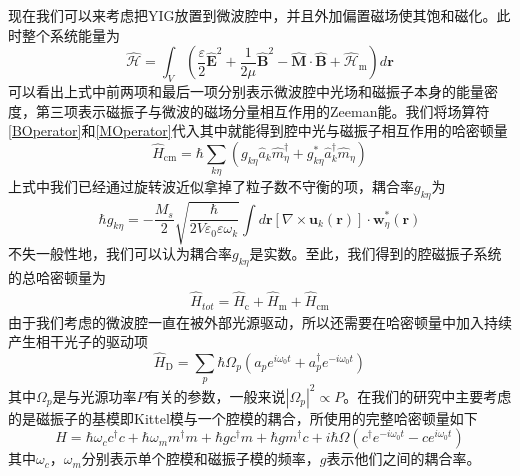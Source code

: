 现在我们可以来考虑把YIG放置到微波腔中，并且外加偏置磁场使其饱和磁化。此时整个系统能量为
\begin{equation}
\hat{\mathcal{H}}=\int_V \left(\frac{\varepsilon}{2} \hat{\mathbf{E}}^{2}+\frac{1}{2 \mu} \hat{\mathbf{B}}^{2}-\hat{\mathbf{M}} \cdot \hat{\mathbf{B}}+\hat{\mathcal{H}}_{\mathrm{m}}\right) d \mathbf{r}
\end{equation}
可以看出上式中前两项和最后一项分别表示微波腔中光场和磁振子本身的能量密度，第三项表示磁振子与微波的磁场分量相互作用的Zeeman能。我们将场算符\eqref{BOperator}和\eqref{MOperator}代入其中就能得到腔中光与磁振子相互作用的哈密顿量
\begin{equation}
\hat{H}_{\mathrm{cm}}=\hbar \sum_{k \eta}\left(g_{k \eta} \hat{a}_{k} \hat{m}_{\eta}^{\dagger}+g_{k \eta}^{*} \hat{a}_{k}^{\dagger} \hat{m}_{\eta}\right)
\end{equation}
上式中我们已经通过旋转波近似拿掉了粒子数不守衡的项，耦合率$g_{k \eta}$为
\begin{equation}
\hbar g_{k \eta}=-\frac{M_{s}}{2} \sqrt{\frac{\hbar}{2 V \varepsilon_{0} \varepsilon \omega_{k}}} \int d \mathbf{r}\left[\nabla \times \mathbf{u}_{k}(\mathbf{r})\right] \cdot \mathbf{w}_{\eta}^{*}(\mathbf{r})
\end{equation}
不失一般性地，我们可以认为耦合率$g_{k \eta}$是实数。至此，我们得到的腔磁振子系统的总哈密顿量为
\begin{equation}
\begin{aligned}
\hat{H}_{tot}=\hat{H}_{\mathrm{c}}+\hat{H}_{\mathrm{m}}+\hat{H}_{\mathrm{cm}}
\end{aligned}
\end{equation}
由于我们考虑的微波腔一直在被外部光源驱动，所以还需要在哈密顿量中加入持续产生相干光子的驱动项
\begin{equation}
\hat{H}_{\mathrm{D}}=\sum_{p} \hbar \Omega_{p}\left({a}_{p} e^{i \omega_{\mathrm{0}} t}+{a}_{p}^{\dagger} e^{-i \omega_{\mathrm{0}} t}\right)
\end{equation}
其中$\Omega_{p}$是与光源功率$P$有关的参数，一般来说$|\Omega_{p}|^2 \propto P$。在我们的研究中主要考虑的是磁振子的基模即Kittel模与一个腔模的耦合，所使用的完整哈密顿量如下
\begin{equation}
H = \hbar\omega_{c}c^{\dag}c+\hbar\omega_{m}m^{\dag}m+\hbar gc^{\dag}m+\hbar gm^{\dag}c+i\hbar\Omega(c^{\dag}e^{-i\omega_{0}t}-ce^{i\omega_{0}t})
\label{Hamiltonian}
\end{equation}
其中$\omega_{c}$，$\omega_{m}$分别表示单个腔模和磁振子模的频率，$g$表示他们之间的耦合率。